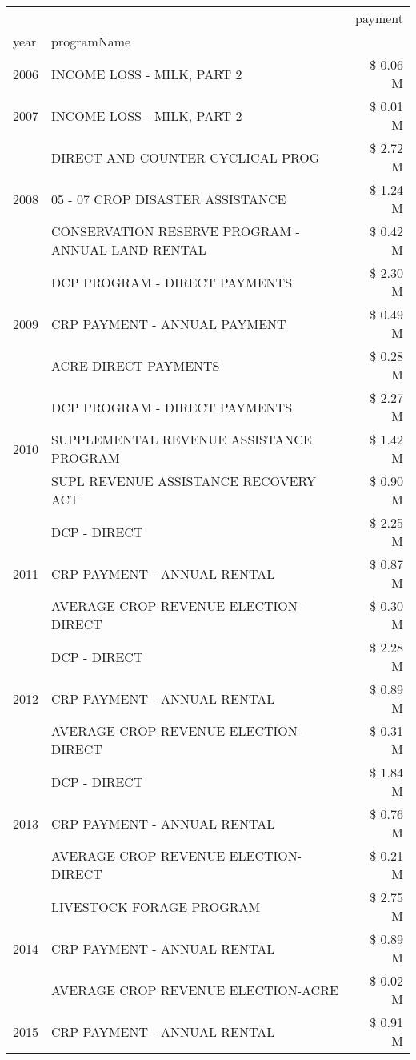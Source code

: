 \begin{tabular}{llr}
\toprule
 &  & payment \\
year & programName &  \\
\midrule
2006 & INCOME LOSS - MILK, PART 2 & \$ 0.06 M \\
\cline{1-3}
2007 & INCOME LOSS - MILK, PART 2 & \$ 0.01 M \\
\cline{1-3}
\multirow[t]{3}{*}{2008} & DIRECT AND COUNTER CYCLICAL PROG & \$ 2.72 M \\
 & 05 - 07 CROP DISASTER ASSISTANCE & \$ 1.24 M \\
 & CONSERVATION RESERVE PROGRAM - ANNUAL LAND RENTAL & \$ 0.42 M \\
\cline{1-3}
\multirow[t]{3}{*}{2009} & DCP PROGRAM - DIRECT PAYMENTS & \$ 2.30 M \\
 & CRP PAYMENT - ANNUAL PAYMENT & \$ 0.49 M \\
 & ACRE DIRECT PAYMENTS & \$ 0.28 M \\
\cline{1-3}
\multirow[t]{3}{*}{2010} & DCP PROGRAM - DIRECT PAYMENTS & \$ 2.27 M \\
 & SUPPLEMENTAL REVENUE ASSISTANCE PROGRAM & \$ 1.42 M \\
 & SUPL REVENUE ASSISTANCE RECOVERY ACT & \$ 0.90 M \\
\cline{1-3}
\multirow[t]{3}{*}{2011} & DCP - DIRECT & \$ 2.25 M \\
 & CRP PAYMENT - ANNUAL RENTAL & \$ 0.87 M \\
 & AVERAGE CROP REVENUE ELECTION-DIRECT & \$ 0.30 M \\
\cline{1-3}
\multirow[t]{3}{*}{2012} & DCP - DIRECT & \$ 2.28 M \\
 & CRP PAYMENT - ANNUAL RENTAL & \$ 0.89 M \\
 & AVERAGE CROP REVENUE ELECTION-DIRECT & \$ 0.31 M \\
\cline{1-3}
\multirow[t]{3}{*}{2013} & DCP - DIRECT & \$ 1.84 M \\
 & CRP PAYMENT - ANNUAL RENTAL & \$ 0.76 M \\
 & AVERAGE CROP REVENUE ELECTION-DIRECT & \$ 0.21 M \\
\cline{1-3}
\multirow[t]{3}{*}{2014} & LIVESTOCK FORAGE PROGRAM & \$ 2.75 M \\
 & CRP PAYMENT - ANNUAL RENTAL & \$ 0.89 M \\
 & AVERAGE CROP REVENUE ELECTION-ACRE & \$ 0.02 M \\
\cline{1-3}
\multirow[t]{3}{*}{2015} & CRP PAYMENT - ANNUAL RENTAL & \$ 0.91 M \\

\end{tabular}
